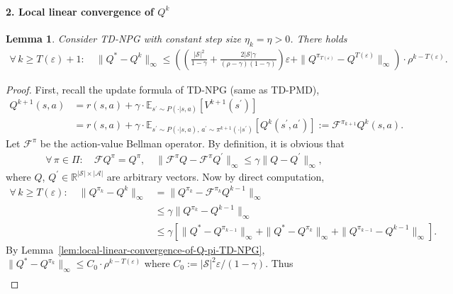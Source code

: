\documentclass[10pt]{article}
\newcommand{\calA}{\mathcal{A}}
\newcommand{\calS}{\mathcal{S}}
\newcommand{\calF}{\mathcal{F}}
\newcommand{\E}{\mathbb{E}}
\newcommand{\ls}{\left}
\newcommand{\rs}{\right}
\theoremstyle{plain}
\newtheorem{lemma}[theorem]{Lemma}
\theoremstyle{definition}
\begin{document}
\paragraph{2. Local linear convergence of $Q^k$} 
\begin{lemma}
    Consider TD-NPG with constant step size $\eta_k = \eta > 0$. There holds
    \begin{align*}
        \forall\, k\geq T(\varepsilon)+1: \quad \| Q^* - Q^k \|_\infty \leq \ls( \ls(\frac{|\calS|^2}{1-\gamma} + \frac{2|\calS|\gamma}{(\rho-\gamma)(1-\gamma)}\rs) \varepsilon + \| Q^{\pi_{T(\varepsilon)}} - Q^{T(\varepsilon)} \|_\infty \rs) \cdot \rho^{k-T(\varepsilon)}.
    \end{align*}
    \label{lem:local-linear-convergence-of-Q-k-TD-NPG}
\end{lemma}
\begin{proof}
    First, recall the update formula of TD-NPG (same as TD-PMD),
    \begin{align*}
        Q^{k+1}(s,a) &= r(s,a) + \gamma \cdot \E_{s^\prime\sim P(\cdot|s,a)} [V^{k+1}(s^\prime)] \\
        &= r(s,a) + \gamma \cdot \E_{s^\prime\sim P(\cdot|s,a), \, a^\prime\sim \pi^{k+1}(\cdot|s^\prime)} [Q^k(s^\prime, a^\prime)] := \calF^{\pi_{k+1}} Q^k(s,a).
    \end{align*}
    Let $\calF^{\pi}$ be the action-value Bellman operator. By definition, it is obvious that
    \begin{align*}
        \forall\, \pi\in\Pi: \quad \calF Q^\pi = Q^\pi, \quad \| \calF ^\pi Q - \calF^\pi Q^\prime \|_\infty \leq \gamma \| Q - Q^\prime \|_\infty,
    \end{align*}
    where $Q$, $Q^\prime \in \mathbb{R}^{|\calS|\times|\calA|}$ are arbitrary vectors. Now by direct computation,
    \begin{align*}
        \forall\, k\geq T(\varepsilon): \quad \| Q^{\pi_k} - Q^k \|_\infty &= \| Q^{\pi_k} - \calF^{\pi_k}Q^{k-1} \|_\infty \\
        &\leq  \gamma \| Q^{\pi_k} - Q^{k-1} \|_\infty \\
        &\leq \gamma \ls[ \| Q^* - Q^{\pi_{k-1}} \|_\infty + \| Q^* - Q^{\pi_k} \|_\infty + \| Q^{\pi_{k-1}} - Q^{k-1} \|_\infty \rs].
    \end{align*}
    By Lemma~\ref{lem:local-linear-convergence-of-Q-pi-TD-NPG}, $\| Q^* - Q^{\pi_k} \|_\infty \leq C_0 \cdot \rho^{k-T(\varepsilon)}$ where $C_0 := |\calS|^2\varepsilon / (1-\gamma)$. Thus
    \begin{align*}

\end{align*}
\end{proof}
\end{document}
